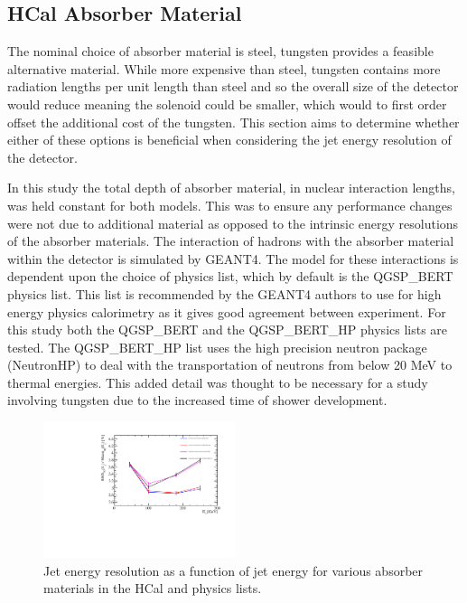 
\subsection{HCal Absorber Material}
\label{sec:hcalabsorbermaterial}
The nominal choice of absorber material is steel, tungsten provides a feasible alternative material.  While more expensive than steel, tungsten contains more radiation lengths per unit length than steel and so the overall size of the detector would reduce meaning the solenoid could be smaller, which would to first order offset the additional cost of the tungsten.  This section aims to determine whether either of these options is beneficial when considering the jet energy resolution of the detector.

In this study the total depth of absorber material, in nuclear interaction lengths, was held constant for both models.  This was to ensure any performance changes were not due to additional material as opposed to the intrinsic energy resolutions of the absorber materials.  The interaction of hadrons with the absorber material within the detector is simulated by GEANT4.  The model for these interactions is dependent upon the choice of physics list, which by default is the QGSP\_BERT physics list.  This list is recommended by the GEANT4 authors to use for high energy physics calorimetry as it gives good agreement between experiment.  For this study both the QGSP\_BERT and the QGSP\_BERT\_HP physics lists are tested.  The QGSP\_BERT\_HP list uses the high precision neutron package (NeutronHP) to deal with the transportation of neutrons from below 20 MeV to thermal energies.  This added detail was thought to be necessary for a study involving tungsten due to the increased time of shower development.    

\begin{figure}
\centering
\includegraphics[width=0.5\textwidth]{OptimisationStudies/Plots/JetEnergyResolutions/JER_vs_JetEnergy_HCalAbsorberMaterial.pdf}
\caption[Jet energy resolution as a function of jet energy for various absorber materials in the HCal and physics lists.]{Jet energy resolution as a function of jet energy for various absorber materials in the HCal and physics lists.}
\label{fig:hcalabsmaterial}
\end{figure} 

